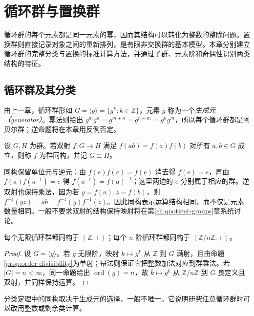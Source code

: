 \setcounter{chapter}{2} %
\chapter{循环群与置换群}\label{ch:cyclic-permutation}

循环群的每个元素都是同一元素的幂，因而其结构可以转化为整数的整除问题。置换群则直接记录对象之间的重新排列，是有限非交换群的基本模型。本章分别建立循环群的完整分类与置换的标准计算方法，并通过子群、元素阶和奇偶性识别两类结构的特征。

\section{循环群及其分类}\label{sec:cyclic-classification}

由上一章，循环群形如 $G=\langle g\rangle=\{g^k:k\in\mathbb Z\}$，元素 $g$ 称为一个\emph{生成元（generator）}。幂法则给出 $g^mg^n=g^{m+n}=g^{n+m}=g^ng^m$，所以每个循环群都是阿贝尔群；逆命题将在本章用反例否定。

\begin{definition}[群同构]\label{def:group-isomorphism}
设 $G,H$ 为群。若双射 $f:G\to H$ 满足 $f(ab)=f(a)f(b)$ 对所有 $a,b\in G$ 成立，则称 $f$ 为群同构，并记 $G\cong H$。
\end{definition}

同构保留单位元与逆元：由 $f(e)f(e)=f(e)$ 消去得 $f(e)=e$，再由 $f(a)f(a^{-1})=e$ 得 $f(a^{-1})=f(a)^{-1}$；这里两边的 $e$ 分别属于相应的群。逆双射也保持乘法，因为若 $y=f(a),z=f(b)$，则 $f^{-1}(yz)=ab=f^{-1}(y)f^{-1}(z)$。因此同构表示运算结构相同，而不仅是元素数量相同。一般不要求双射的结构保持映射将在第\ref{ch:quotient-groups}章系统讨论。

\begin{theorem}[循环群的分类]\label{thm:cyclic-classification}
每个无限循环群都同构于 $(\mathbb Z,+)$；每个 $n$ 阶循环群都同构于 $(\mathbb Z/n\mathbb Z,+)$。
\end{theorem}
\begin{proof}
设 $G=\langle g\rangle$。若 $g$ 无限阶，映射 $k\mapsto g^k$ 从 $\mathbb Z$ 到 $G$ 满射，且由命题\ref{prop:order-divisibility}为单射；幂法则保证它把整数加法对应到群乘法。若 $|G|=n<\infty$，同一命题给出 $\operatorname{ord}(g)=n$，故 $\overline k\mapsto g^k$ 从 $\mathbb Z/n\mathbb Z$ 到 $G$ 良定义且双射，并同样保持运算。
\end{proof}

分类定理中的同构取决于生成元的选择，一般不唯一。它说明研究任意循环群时可以改用整数或剩余类计算。

